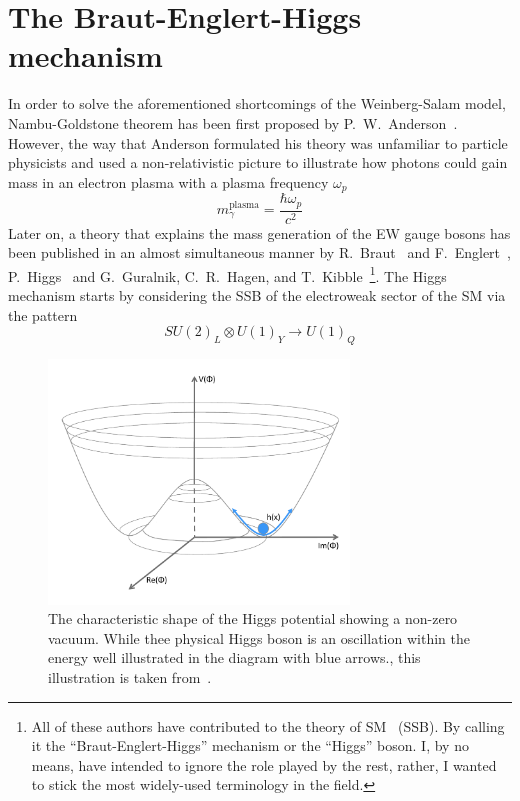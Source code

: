 \section{The Braut-Englert-Higgs mechanism \label{Higgsmech}}
In order to solve the aforementioned shortcomings of the Weinberg-Salam model, Nambu-Goldstone theorem has been first proposed by P.~W.~Anderson~\cite{PhysRev.130.439}. However, the way that Anderson formulated his theory was unfamiliar to particle physicists and used a non-relativistic picture to illustrate how photons could gain mass in an electron plasma with a plasma frequency $\omega_{p}$ 
\begin{equation}
    m_\gamma^{\mathrm{plasma}} =\frac{\hbar \omega_p}{c^2}
\end{equation}
Later on, a theory that explains the mass generation of the EW gauge bosons has been published in an almost simultaneous manner by R.~Braut~ and F.~Englert~\cite{PhysRevLett.13.321}, P.~Higgs~\cite{PhysRevLett.13.508} and G.~Guralnik, C.~R.~Hagen, and T.~Kibble~\cite{PhysRevLett.13.585,Guralnik:2009jd}\footnote{All of these authors have contributed to the theory of SM ~(SSB). By calling it the ``Braut-Englert-Higgs'' mechanism or the ``Higgs'' boson. I, by no means, have intended to ignore the role played by the rest, rather, I wanted to stick the most widely-used terminology in the field.}.
The Higgs mechanism starts by considering the SSB of the electroweak sector of the SM via the pattern
\begin{equation}
    SU(2)_L \otimes U(1)_Y \longrightarrow U(1)_{Q} 
\end{equation}
\begin{figure}[t!]
	\begin{center}
		\includegraphics[width=8cm]{figures/HiggsPotential}
		\caption{The characteristic shape of the Higgs potential showing a non-zero vacuum. While thee physical Higgs boson is an oscillation within the energy well illustrated in the diagram with blue arrows., this illustration is taken from~\cite{Erler:2019hds}. \label{fig:higgs_hat} }
	\end{center}
\end{figure}
